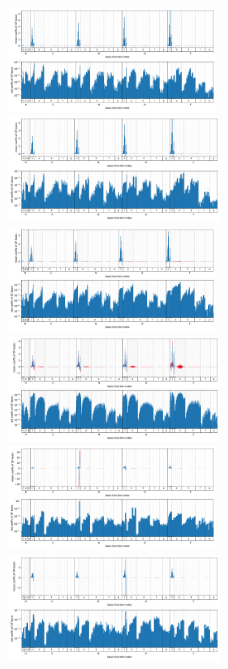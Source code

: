\begin{figure}
    \centering
        \includegraphics[width=0.49\textwidth]{chapters/results/results_images/var_coeffseven_tempered_3.0}
        \includegraphics[width=0.5\textwidth]{chapters/results/results_images/var_coeffseven_tempered_2.5}
        \includegraphics[width=0.49\textwidth]{chapters/results/results_images/var_coeffseven_tempered_2.0}
        \includegraphics[width=0.5\textwidth]{chapters/results/results_images/var_coeffseven_tempered_1.5}
        \includegraphics[width=0.49\textwidth]{chapters/results/results_images/var_coeffsfitted_basis_3.0}
        \includegraphics[width=0.5\textwidth]{chapters/results/results_images/var_coeffsfitted_basis_2.5}

\end{figure}
